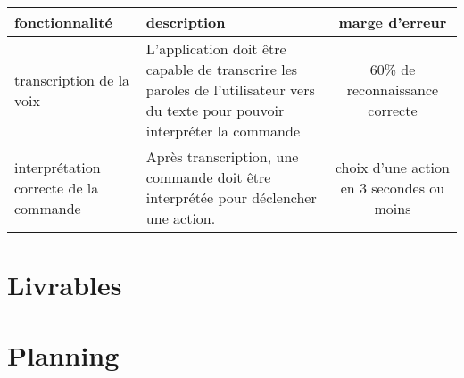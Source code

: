 \documentclass[12pt]{article}
\begin{document}
    \begin{tabular}{|l|l|c|}
        \hline
        fonctionnalité & description & marge d'erreur \\
        \hline
        transcription de la voix & L'application doit être capable de transcrire
        les paroles de l'utilisateur vers du texte pour pouvoir interpréter la
        commande & 60\% de reconnaissance correcte \\
        interprétation correcte de la commande & Après transcription, une
        commande doit être interprétée pour déclencher une action. &
        choix d'une action en 3 secondes ou moins \\
        \hline
    \end{tabular}

    \section{Livrables}

    \section{Planning}
\end{document}
